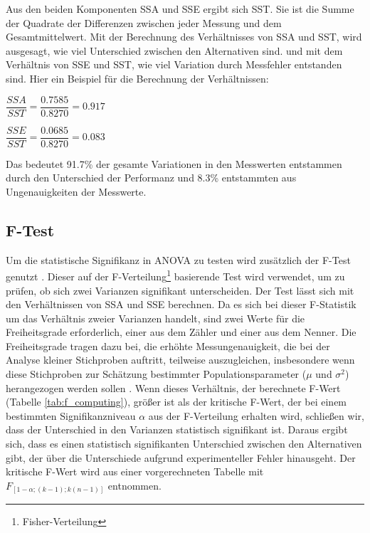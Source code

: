 Aus den beiden Komponenten SSA und SSE ergibt sich SST.
Sie ist die Summe der Quadrate der Differenzen zwischen jeder Messung und dem Gesamtmittelwert.
Mit der Berechnung des Verhältnisses von SSA und SST, wird ausgesagt, wie viel Unterschied zwischen den Alternativen sind.
und mit dem Verhältnis von SSE und SST, wie viel Variation durch Messfehler entstanden sind.  
Hier ein Beispiel für die Berechnung der Verhältnissen:

\begin{center}
  $\dfrac{SSA}{SST} = \dfrac{0.7585}{0.8270} = 0.917$
\end{center}

\begin{center}
  $\dfrac{SSE}{SST} = \dfrac{0.0685}{0.8270} = 0.083$
\end{center}

Das bedeutet 91.7\% der gesamte Variationen in den Messwerten entstammen durch den Unterschied der Performanz und
8.3\% entstammten aus Ungenauigkeiten der Messwerte. 

\subsection{F-Test}
Um die statistische Signifikanz in ANOVA zu testen wird zusätzlich der F-Test genutzt \cite[S. 71 ff.]{Lilja_2000}.
Dieser auf der F-Verteilung\footnote{Fisher-Verteilung} basierende Test wird verwendet, um zu prüfen, ob sich zwei Varianzen signifikant unterscheiden.
Der Test lässt sich mit den Verhältnissen von SSA und SSE berechnen.
Da es sich bei dieser F-Statistik um das Verhältnis zweier Varianzen handelt, sind zwei Werte für die Freiheitsgrade erforderlich, 
einer aus dem Zähler und einer aus dem Nenner.
Die Freiheitsgrade tragen dazu bei, die erhöhte Messungenauigkeit, die bei der Analyse kleiner Stichproben auftritt, 
teilweise auszugleichen, insbesondere wenn diese Stichproben zur Schätzung bestimmter Populationsparameter ($\mu$ und $\sigma^2$) herangezogen werden sollen \cite[S. 49]{inferenzstatistik}.
Wenn dieses Verhältnis, der berechnete F-Wert (Tabelle \ref{tab:f_computing}), größer ist als der kritische F-Wert, der bei einem bestimmten Signifikanzniveau $\alpha$ aus der F-Verteilung erhalten wird, 
schließen wir, dass der Unterschied in den Varianzen statistisch signifikant ist. Daraus ergibt sich, 
dass es einen statistisch signifikanten Unterschied zwischen den Alternativen gibt, der über die Unterschiede aufgrund experimenteller Fehler hinausgeht.
Der kritische F-Wert wird aus einer vorgerechneten Tabelle mit $F_{[1-\alpha;(k-1);k(n-1)]}$ entnommen.

